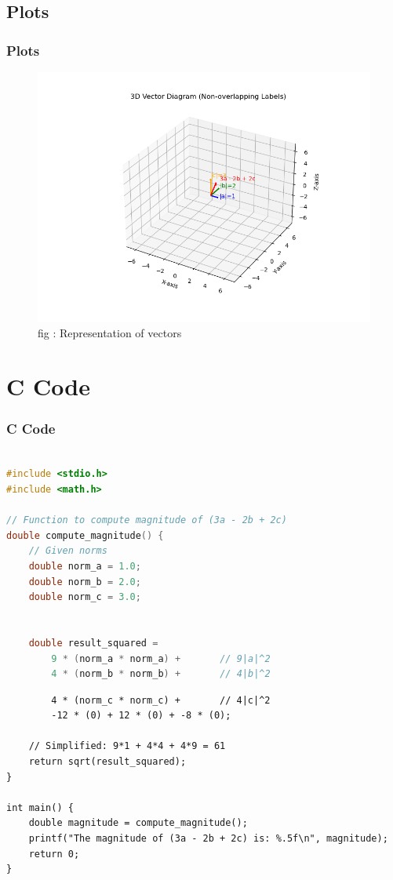 \documentclass{beamer}
\theoremstyle{remark}
\numberwithin{equation}{section}
\begin{document}
\subsection{Plots}
\begin{frame}
\frametitle{Plots}
\begin{figure}
\centering
\includegraphics[width=0.9\columnwidth]{figs/fig3.png}
\caption{fig : Representation of vectors}
\label{Fig3}
\end{figure}
\end{frame}
\section{C Code}
\begin{frame}[fragile]
\frametitle{C Code }
\begin{lstlisting}[language=C]

#include <stdio.h>
#include <math.h>

// Function to compute magnitude of (3a - 2b + 2c)
double compute_magnitude() {
    // Given norms
    double norm_a = 1.0;
    double norm_b = 2.0;
    double norm_c = 3.0;


    double result_squared =
        9 * (norm_a * norm_a) +       // 9|a|^2
        4 * (norm_b * norm_b) +       // 4|b|^2
        \end{lstlisting}
        \end{frame}
        \begin{frame}[fragile]
        \begin{lstlisting}
        4 * (norm_c * norm_c) +       // 4|c|^2
        -12 * (0) + 12 * (0) + -8 * (0);

    // Simplified: 9*1 + 4*4 + 4*9 = 61
    return sqrt(result_squared);
}

int main() {
    double magnitude = compute_magnitude();
    printf("The magnitude of (3a - 2b + 2c) is: %.5f\n", magnitude);
    return 0;
}
    
\end{lstlisting}
\end{frame}
\end{document}
